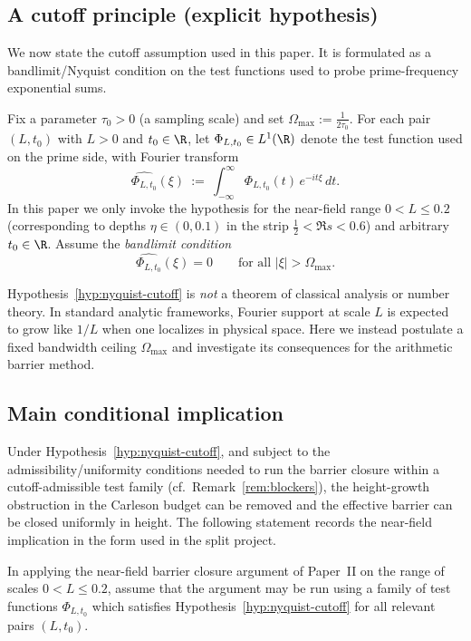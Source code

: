 \documentclass[11pt]{article}
\begin{document}
\subsection*{A cutoff principle (explicit hypothesis)}
We now state the cutoff assumption used in this paper.
It is formulated as a bandlimit/Nyquist condition on the test functions used to probe prime-frequency exponential sums.

\begin{hypothesis}\label{hyp:nyquist-cutoff}
Fix a parameter $\tau_0>0$ (a sampling scale) and set $\Omega_{\max}:=\frac{1}{2\tau_0}$.
For each pair $(L,t_0)$ with $L>0$ and $t_0\in\R$, let $\Phi_{L,t_0}\in L^1(\R)$ denote the test function used on the prime side, with Fourier transform
\[
  \widehat{\Phi_{L,t_0}}(\xi)\ :=\ \int_{-\infty}^{\infty}\Phi_{L,t_0}(t)\,e^{-it\xi}\,dt.
\]
In this paper we only invoke the hypothesis for the near-field range $0<L\le 0.2$ (corresponding to depths $\eta\in(0,0.1)$ in the strip $\tfrac12<\Re s<0.6$) and arbitrary $t_0\in\R$.
Assume the \emph{bandlimit condition}
\[
  \widehat{\Phi_{L,t_0}}(\xi)=0
  \qquad \text{for all }|\xi|>\Omega_{\max}.
\]
\end{hypothesis}

\begin{remark}\label{rem:hyp-status}
Hypothesis~\ref{hyp:nyquist-cutoff} is \emph{not} a theorem of classical analysis or number theory.
In standard analytic frameworks, Fourier support at scale $L$ is expected to grow like $1/L$ when one localizes in physical space.
Here we instead postulate a fixed bandwidth ceiling $\Omega_{\max}$ and investigate its consequences for the arithmetic barrier method.
\end{remark}

\subsection*{Main conditional implication}
Under Hypothesis~\ref{hyp:nyquist-cutoff}, and subject to the admissibility/uniformity conditions needed to run the barrier closure within a cutoff-admissible test family (cf.\ Remark~\ref{rem:blockers}), the height-growth obstruction in the Carleson budget can be removed and the effective barrier can be closed uniformly in height.
The following statement records the near-field implication in the form used in the split project.

\begin{hypothesis}\label{hyp:cutoff-admissibility}
In applying the near-field barrier closure argument of Paper~II on the range of scales $0<L\le 0.2$, assume that the argument may be run using a family of test functions $\Phi_{L,t_0}$ which satisfies Hypothesis~\ref{hyp:nyquist-cutoff} for all relevant pairs $(L,t_0)$.
\end{hypothesis}
\end{document}
